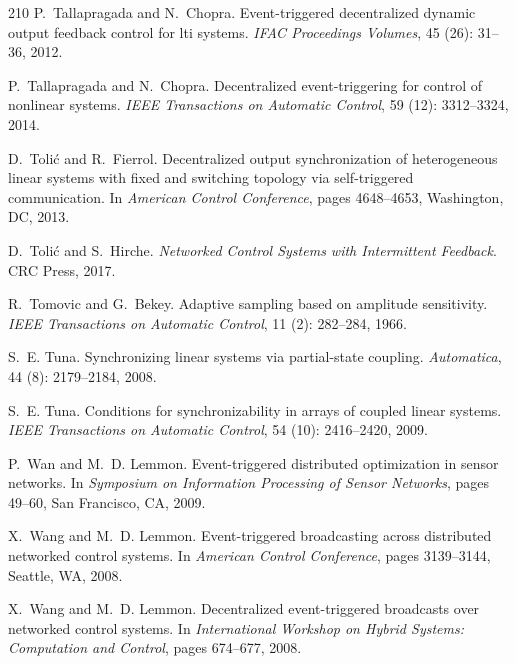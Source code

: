 \documentclass{autart}
\begin{document}
{\begin{thebibliography}{210}
P.~Tallapragada and N.~Chopra.
\newblock Event-triggered decentralized dynamic output feedback control for lti
  systems.
\newblock \emph{IFAC Proceedings Volumes}, 45 (26): 31--36,
  2012.

P.~Tallapragada and N.~Chopra.
\newblock Decentralized event-triggering for control of nonlinear systems.
\newblock \emph{IEEE Transactions on Automatic Control}, 59
  (12): 3312--3324, 2014.

D.~Toli{\'c} and R.~Fierrol.
\newblock Decentralized output synchronization of heterogeneous linear systems
  with fixed and switching topology via self-triggered communication.
\newblock In \emph{{A}merican {C}ontrol {C}onference}, pages 4648--4653,
  Washington, DC, 2013.

D.~Toli{\'c} and S.~Hirche.
\newblock \emph{Networked Control Systems with Intermittent Feedback}.
\newblock CRC Press, 2017.

R.~Tomovic and G.~Bekey.
\newblock Adaptive sampling based on amplitude sensitivity.
\newblock \emph{IEEE Transactions on Automatic Control}, 11
  (2): 282--284, 1966.

S.~E. Tuna.
\newblock Synchronizing linear systems via partial-state coupling.
\newblock \emph{Automatica}, 44 (8): 2179--2184, 2008.

S.~E. Tuna.
\newblock Conditions for synchronizability in arrays of coupled linear systems.
\newblock \emph{IEEE Transactions on Automatic Control}, 54
  (10): 2416--2420, 2009.

P.~Wan and M.~D. Lemmon.
\newblock Event-triggered distributed optimization in sensor networks.
\newblock In \emph{Symposium on Information Processing of Sensor Networks},
  pages 49--60, San Francisco, CA, 2009.

X.~Wang and M.~D. Lemmon.
\newblock Event-triggered broadcasting across distributed networked control
  systems.
\newblock In \emph{{A}merican {C}ontrol {C}onference}, pages 3139--3144,
  Seattle, WA, 2008{}.

X.~Wang and M.~D. Lemmon.
\newblock Decentralized event-triggered broadcasts over networked control
  systems.
\newblock In \emph{International Workshop on Hybrid Systems: Computation and
  Control}, pages 674--677, 2008{}.


\end{thebibliography}}
\end{document}
